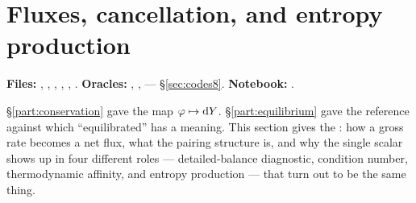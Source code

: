 %
%
%

\section{Fluxes, cancellation, and entropy production}
\label{part:fluxes}

\begin{repopointer}
\textbf{Files:} , ,
, ,
, . \quad
\textbf{Oracles:} ,
,
 --- \S\ref{sec:codes8}. \quad
\textbf{Notebook:} .
\end{repopointer}

\S\ref{part:conservation} gave the map $\varphi \mapsto \mathrm{d} Y$.
\S\ref{part:equilibrium} gave the reference against which ``equilibrated'' has a
meaning. This section gives the \netflux: how a gross rate becomes a net flux,
what the pairing structure is, and why the single scalar \kap{} shows up in
four different roles --- detailed-balance diagnostic, condition number,
thermodynamic affinity, and entropy production --- that turn out to be the same
thing.

